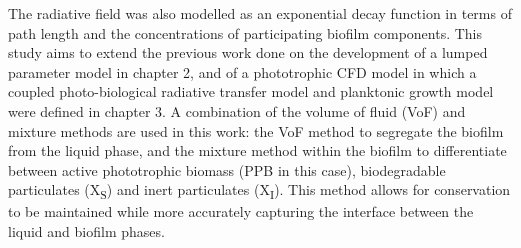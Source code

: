 The radiative field was also modelled as an exponential decay function in terms of path length and the concentrations of participating biofilm components.
\skippingparagraph
This study aims to extend the previous work done on the development of a lumped parameter model in chapter 2, and of a phototrophic CFD model in which a coupled photo-biological radiative transfer model and planktonic growth model were defined in chapter 3. A combination of the volume of fluid (VoF) and mixture methods are used in this work: the VoF method to segregate the biofilm from the liquid phase, and the mixture method within the biofilm to differentiate between active phototrophic biomass (PPB  in this case), biodegradable particulates (X\textsubscript{S}) and inert particulates (X\textsubscript{I}). This method allows for conservation to be maintained while more accurately capturing the interface between the liquid and biofilm phases. 





